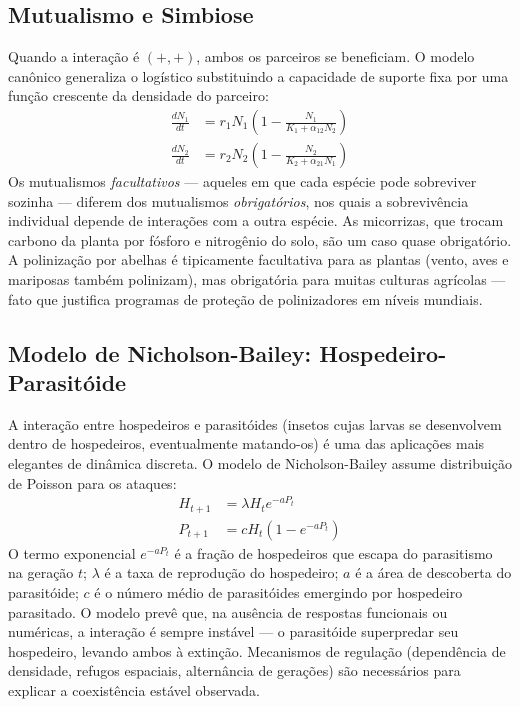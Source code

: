 \subsection{Mutualismo e Simbiose}
\label{sub:image10-mutualismo}

Quando a interação é $(+,+)$, ambos os parceiros se beneficiam. O modelo
canônico generaliza o logístico substituindo a capacidade de suporte fixa
por uma função crescente da densidade do parceiro:
\begin{align}
\frac{dN_1}{dt} &= r_1 N_1 \left(1 - \frac{N_1}{K_1 + \alpha_{12} N_2}\right) \\
\frac{dN_2}{dt} &= r_2 N_2 \left(1 - \frac{N_2}{K_2 + \alpha_{21} N_1}\right)
\end{align}
Os mutualismos \emph{facultativos} --- aqueles em que cada espécie pode
sobreviver sozinha --- diferem dos mutualismos \emph{obrigatórios}, nos quais
a sobrevivência individual depende de interações com a outra espécie. As
micorrizas, que trocam carbono da planta por fósforo e nitrogênio do solo, são
um caso quase obrigatório. A polinização por abelhas é tipicamente
facultativa para as plantas (vento, aves e mariposas também polinizam), mas
obrigatória para muitas culturas agrícolas --- fato que justifica programas
de proteção de polinizadores em níveis mundiais.

\subsection{Modelo de Nicholson-Bailey: Hospedeiro-Parasitóide}
\label{sub:image10-nicholson-bailey}

A interação entre hospedeiros e parasitóides (insetos cujas larvas se
desenvolvem dentro de hospedeiros, eventualmente matando-os) é uma das
aplicações mais elegantes de dinâmica discreta. O modelo de Nicholson-Bailey
assume distribuição de Poisson para os ataques:
\begin{align}
H_{t+1} &= \lambda H_t e^{-a P_t} \\
P_{t+1} &= c H_t \left(1 - e^{-a P_t}\right)
\end{align}
O termo exponencial $e^{-a P_t}$ é a fração de hospedeiros que escapa do
parasitismo na geração $t$; $\lambda$ é a taxa de reprodução do hospedeiro;
$a$ é a área de descoberta do parasitóide; $c$ é o número médio de parasitóides
emergindo por hospedeiro parasitado. O modelo prevê que, na ausência de
respostas funcionais ou numéricas, a interação é sempre instável --- o
parasitóide superpredar seu hospedeiro, levando ambos à extinção. Mecanismos
de regulação (dependência de densidade, refugos espaciais, alternância de
gerações) são necessários para explicar a coexistência estável observada.

